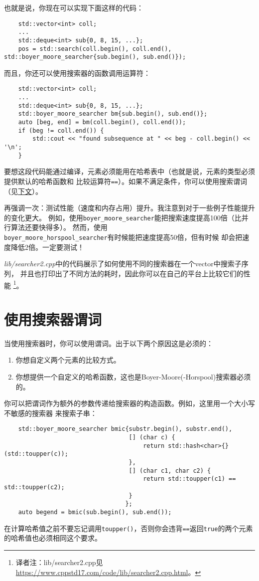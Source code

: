 也就是说，你现在可以实现下面这样的代码：
\begin{lstlisting}
    std::vector<int> coll;
    ...
    std::deque<int> sub{0, 8, 15, ...};
    pos = std::search(coll.begin(), coll.end(), std::boyer_moore_searcher{sub.begin(), sub.end()});
\end{lstlisting}
而且，你还可以使用搜索器的函数调用运算符：
\begin{lstlisting}
    std::vector<int> coll;
    ...
    std::deque<int> sub{0, 8, 15, ...};
    std::boyer_moore_searcher bm{sub.begin(), sub.end()};
    auto [beg, end] = bm(coll.begin(), coll.end());
    if (beg != coll.end()) {
        std::cout << "found subsequence at " << beg - coll.begin() << '\n';
    }
\end{lstlisting}
要想这段代码能通过编译，元素必须能用在哈希表中（也就是说，元素的类型必须提供默认的哈希函数和
比较运算符\texttt{==}）。如果不满足条件，你可以使用搜索谓词（见\hyperref[ch24.3]{下文}）。

再强调一次：测试性能（速度和内存占用）提升。我注意到对于一些例子性能提升的变化更大。
例如，使用\texttt{boyer\_moore\_searcher}能把搜索速度提高100倍（比并行算法还要快得多）。
然而，使用\\
\texttt{boyer\_moore\_horspool\_searcher}有时候能把速度提高50倍，但有时候
却会把速度降低2倍。一定要测试！

\emph{lib/searcher2.cpp}中的代码展示了如何使用不同的搜索器在一个vector中搜索子序列，
并且也打印出了不同方法的耗时，因此你可以在自己的平台上比较它们的性能
\footnote{译者注：lib/searcher2.cpp见\url{https://www.cppstd17.com/code/lib/searcher2.cpp.html}。}。

\section{使用搜索器谓词}\label{ch24.3}
当使用搜索器时，你可以使用谓词。出于以下两个原因这是必须的：
\begin{enumerate}
    \item 你想自定义两个元素的比较方式。
    \item 你想提供一个自定义的哈希函数，这也是Boyer-Moore(-Horspool)搜索器必须的。
\end{enumerate}
你可以把谓词作为额外的参数传递给搜索器的构造函数。例如，这里用一个大小写不敏感的搜索器
来搜索子串：
\begin{lstlisting}
    std::boyer_moore_searcher bmic{substr.begin(), substr.end(),
                                   [] (char c) {
                                       return std::hash<char>{}(std::toupper(c));
                                   },
                                   [] (char c1, char c2) {
                                       return std::toupper(c1) == std::toupper(c2);
                                   }
                                  };
    auto begend = bmic(sub.begin(), sub.end());
\end{lstlisting}
在计算哈希值之前不要忘记调用\texttt{toupper()}，否则你会违背\texttt{==}返回\texttt{true}的两个元素
的哈希值也必须相同这个要求。

